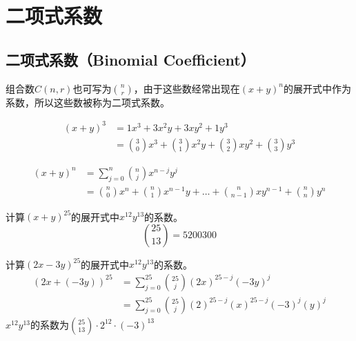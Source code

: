 \documentclass[12pt, openany, oneside]{book}
\begin{document}
\newpage

\section{二项式系数}

\subsection{二项式系数（Binomial Coefficient）}

组合数$ C(n, r) $也可写为$ n \choose r $，由于这些数经常出现在$ (x + y)^n $的展开式中作为系数，所以这些数被称为二项式系数。

\vspace{-1cm}

\begin{align*}
	(x + y)^3 & = 1x^3 + 3x^2y + 3xy^2 + 1y^3                                                     \\
	          & = {3 \choose 0} x^3 + {3 \choose 1} x^2y + {3 \choose 2} xy^2 + {3 \choose 3} y^3
\end{align*}

\begin{tcolorbox}
	\begin{align}
		(x + y)^n & = \sum_{j=0}^{n} {n \choose j}x^{n-j}y^j                                                            \\
		\nonumber
		          & = {n \choose 0} x^n + {n \choose 1} x^{n-1}y + \dots + {n \choose n-1} xy^{n-1} + {n \choose n} y^n
	\end{align}
\end{tcolorbox}

\begin{tcolorbox}
	计算$ (x + y)^{25} $的展开式中$ x^{12}y^{13} $的系数。\\
	$$
		{25 \choose 13} = 5200300
	$$
\end{tcolorbox}

\begin{tcolorbox}
	计算$ (2x - 3y)^{25} $的展开式中$ x^{12}y^{13} $的系数。
	\begin{align*}
		(2x + (-3y))^{25} & = \sum_{j=0}^{25} {25 \choose j} (2x)^{25-j} (-3y)^j                \\
		                  & = \sum_{j=0}^{25} {25 \choose j} (2)^{25-j} (x)^{25-j} (-3)^j (y)^j
	\end{align*}
	$ x^{12}y^{13} $的系数为$ {25 \choose 13} \cdot 2^{12} \cdot (-3)^{13} $
\end{tcolorbox}
\end{document}
